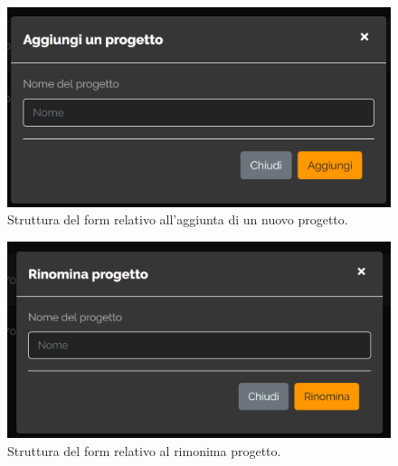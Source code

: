 
\begin{figure}[H]
	\centering
	\caption{Struttura del form relativo all'aggiunta di un nuovo progetto.}
	\label{fig:struttura-form:aggiunta-progetto}
	\includegraphics[width=\textwidth]{images/struttura-form/form-aggiungi-progetto}
\end{figure}

\begin{figure}[H]
	\centering
	\caption{Struttura del form relativo al rimonima progetto.}
	\label{fig:struttura-form:rinomina-progetto}
	\includegraphics[width=\textwidth]{images/struttura-form/form-rinomina-progetto}
\end{figure}

